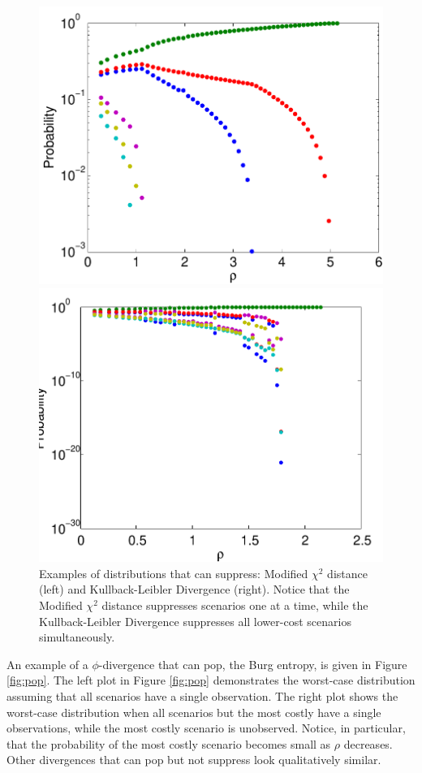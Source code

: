 \documentclass[ijoc,letterpaper]{informs3} %
\begin{document}
\begin{figure}
	\FIGURE
	{%
		\includegraphics*[width=.5\textwidth]{images/mchi2}%
		\includegraphics*[width=.5\textwidth]{images/kl}%
	}
	{
		Examples of distributions that can suppress: Modified $\chi^2$ distance (left) and Kullback-Leibler Divergence (right).
		Notice that the Modified $\chi^2$ distance suppresses scenarios one at a time, while the Kullback-Leibler Divergence suppresses all lower-cost scenarios simultaneously.
		\label{fig:suppress}
	}
	{}
\end{figure}

An example of a $\phi$-divergence that can pop, the Burg entropy, is given in Figure \ref{fig:pop}.
The left plot in Figure \ref{fig:pop} demonstrates the worst-case distribution assuming that all scenarios have a single observation.
The right plot shows the worst-case distribution when all scenarios but the most costly have a single observations, while the most costly scenario is unobserved.
Notice, in particular, that the probability of the most costly scenario becomes small as $\rho$ decreases.
Other divergences that can pop but not suppress look qualitatively similar.
\end{document}

